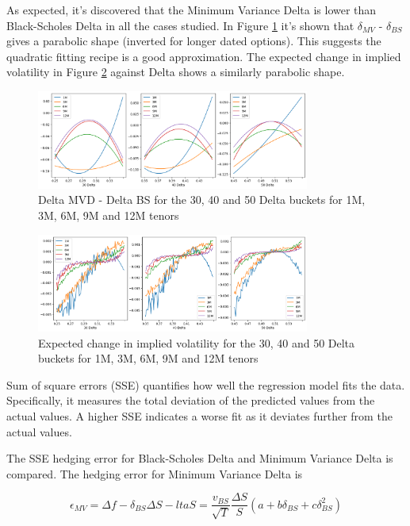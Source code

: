 \documentclass{article}
\newcommand{\para}{\vspace{8pt}} %
\begin{document}
As expected, it's discovered that the Minimum Variance Delta is lower than Black-Scholes Delta in all the cases studied. In Figure \ref{fig:mvd-bs} it's shown that
$\delta_{MV}$ - $\delta_{BS}$ gives a parabolic shape (inverted for longer dated options). This suggests the quadratic fitting recipe is a good approximation.
The expected change in implied volatility in Figure \ref{fig:eiv} against Delta shows a similarly parabolic shape.

\begin{figure}[h]
    \centering
    \includegraphics[width=0.8\textwidth]{images/mvd-bs.png}
    \caption{Delta MVD - Delta BS for the 30, 40 and 50 Delta buckets for 1M, 3M, 6M, 9M and 12M tenors}
    \label{fig:mvd-bs}
\end{figure}


\begin{figure}[h]
    \centering
    \includegraphics[width=0.8\textwidth]{images/eiv.png}
    \caption{Expected change in implied volatility for the 30, 40 and 50 Delta buckets for 1M, 3M, 6M, 9M and 12M tenors}
    \label{fig:eiv}
\end{figure}


Sum of square errors (SSE) quantifies how well the regression model fits the data. 
Specifically, it measures the total deviation of the predicted values from the actual values. A higher SSE indicates a worse fit as it
deviates further from the actual values. 

\para
The SSE hedging error for Black-Scholes Delta and Minimum Variance Delta is compared. The hedging
error for Minimum Variance Delta is 

\[
\epsilon_{MV} = \Delta f - \delta_{BS} \Delta S - lta S = \frac{v_{BS}}{\sqrt{T}} \frac{\Delta S}{S} (a + b \delta_{BS} + c \delta_{BS}^2)
\]
\end{document}
